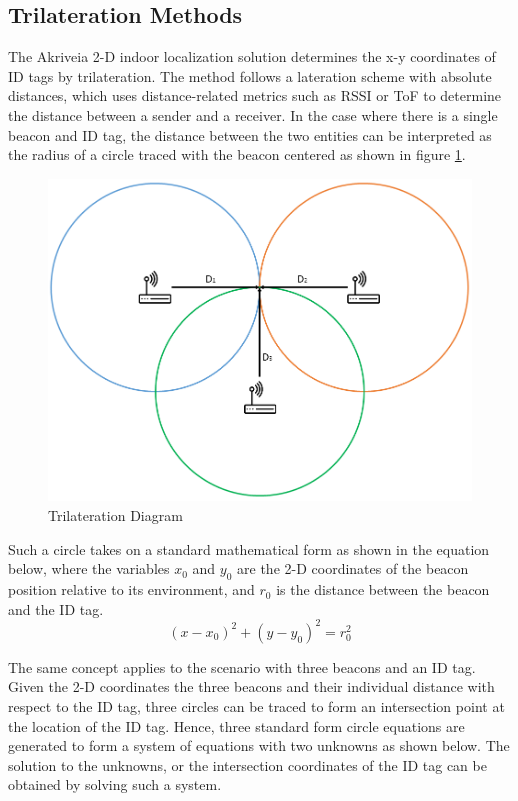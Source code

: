 \pagebreak
\subsection{Trilateration Methods}
\medskip
The Akriveia 2-D indoor localization solution determines the x-y coordinates of ID tags by trilateration. The method follows a lateration scheme with absolute distances, which uses distance-related metrics such as RSSI or ToF to determine the distance between a sender and a receiver. In the case where there is a single beacon and ID tag, the distance between the two entities can be interpreted as the radius of a circle traced with the beacon centered as shown in figure \ref{tri}. 

\begin{figure}[H]
\centering
    \includegraphics[scale=0.5]{./images/Tri.png}
    \caption{Trilateration Diagram}
    \label{tri}
\end{figure}
\medskip

Such a circle takes on a standard mathematical form as shown in the equation below, where the variables $x_0$ and $y_0$ are the 2-D coordinates of the beacon position relative to its environment, and $r_0$ is the distance between the beacon and the ID tag. 
\medskip
\begin{equation*}
	(x-x_{0})^2 + (y-y_{0})^2 = r_{0}^2
\end{equation*}

\medskip
The same concept applies to the scenario with three beacons and an ID tag. Given the 2-D coordinates the three beacons and their individual distance with respect to the ID tag, three circles can be traced to form an intersection point at the location of the ID tag. Hence, three standard form circle equations are generated to form a system of equations with two unknowns as shown below. The solution to the unknowns, or the intersection coordinates of the ID tag can be obtained by solving such a system.


